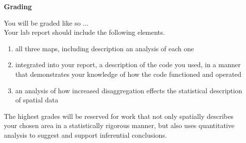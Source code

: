 \documentclass{article}
\begin{document}
\textbf{Grading}

\vspace{4mm}

\setlength{\leftskip}{1cm}

\setlength{\parindent}{0cm}

You will be graded like so ...   \\

Your lab report should include the following elements.

\begin{enumerate}[leftmargin=15mm]

\item all three maps, including description an analysis of each one

\item integrated into your report, a description of the code you used, in a manner that demonstrates your knowledge of how the code functioned and operated

\item an analysis of how increased disaggregation effects the statistical description of spatial data

\end{enumerate}

The highest grades will be reserved for work that not only spatially describes your chosen area in a statistically rigorous manner, but also uses quantitative analysis to suggest and support inferential conclusions. \\

\vspace{7mm}

\setlength{\leftskip}{0cm}

\end{document}
